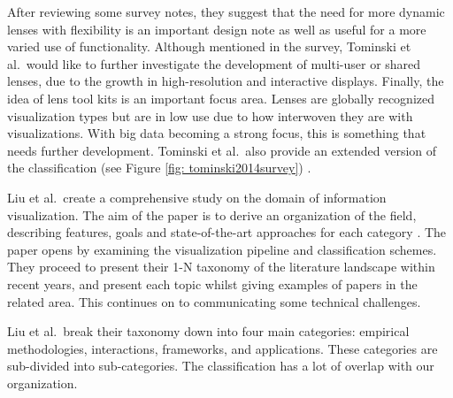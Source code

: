 After reviewing some survey notes, they suggest that the need for more dynamic lenses with flexibility is an important design note as well as useful for a more varied use of functionality. Although mentioned in the survey, Tominski et al.\ would like to further investigate the development of multi-user or shared lenses, due to the growth in high-resolution and interactive displays. Finally, the idea of lens tool kits is an important focus area. Lenses are globally recognized visualization types but are in low use due to how interwoven they are with visualizations. With big data becoming a strong focus, this is something that needs further development. Tominski et al.\ also provide an extended version of the classification (see Figure \ref{fig: tominski2014survey}) \cite{tominski2016interactive}.

Liu et al.\ create a comprehensive study on the domain of information visualization. The aim of the paper is to derive an organization of the field, describing features, goals and state-of-the-art approaches for each category \cite{liu2014survey}.
The paper opens by examining the visualization pipeline and classification schemes. They proceed to present their 1-N taxonomy of the literature landscape within recent years, and present each topic whilst giving examples of papers in the related area. This continues on to communicating some technical challenges.

Liu et al.\ break their taxonomy down into four main categories: empirical methodologies, interactions, frameworks, and applications. These categories are sub-divided into sub-categories. The classification has a lot of overlap with our organization. 



